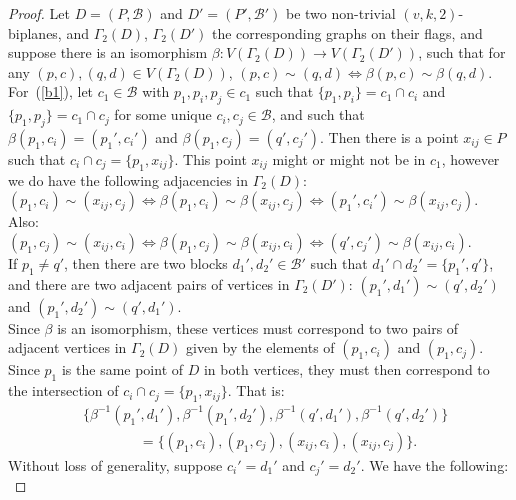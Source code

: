 \documentclass[letterpaper,10pt]{article}
\theoremstyle{plain}
\theoremstyle{definition}
\begin{document}
\begin{proof}
    Let $D=(P,\mathcal{B})$ and $D'=(P',\mathcal{B}')$ be two non-trivial $(v,k,2)$-biplanes, and $\Gamma_2(D)$, $\Gamma_2(D')$ the corresponding graphs on their flags, and suppose there is an isomorphism $\beta:V(\Gamma_2(D))\to V(\Gamma_2(D'))$, such that for any $(p,c),(q,d)\in V(\Gamma_2(D))$, $(p,c)\sim(q,d)\iff\beta(p,c)\sim\beta(q,d)$.\\
    
    For~(\ref{b1}), let $c_1\in\mathcal{B}$ with $p_1,p_i,p_j\in c_1$ such that $\{p_1,p_i\}=c_1\cap c_i$ and $\{p_1,p_j\}=c_1\cap c_j$ for some unique $c_i,c_j\in\mathcal{B}$, and such that $\beta(p_1,c_i)=(p_1',c_i')$ and $\beta(p_1,c_j)=(q',c_j')$. Then there is a point $x_{ij}\in P$ such that $c_i\cap c_j=\{p_1,x_{ij}\}$. This point $x_{ij}$ might or might not be in $c_1$, however we do have the following adjacencies in $\Gamma_2(D)$:\\

$(p_1,c_i)\sim(x_{ij},c_j)\iff\beta(p_1,c_i)\sim\beta(x_{ij},c_j)\iff(p_1',c_i')\sim\beta(x_{ij},c_j).$\\
    
    Also:\\
    
$(p_1,c_j)\sim(x_{ij},c_i)\iff\beta(p_1,c_j)\sim\beta(x_{ij},c_i)\iff(q',c_j')\sim\beta(x_{ij},c_i)$.\\

    If $p_1\neq q'$, then there are two blocks $d_1',d_2'\in\mathcal{B}'$ such that $d_1'\cap d_2'=\{p_1',q'\}$, and there are two adjacent pairs of vertices in $\Gamma_2(D')$: $(p_1',d_1')\sim(q',d_2')$ and $(p_1',d_2')\sim(q',d_1')$.\\

    Since $\beta$ is an isomorphism, these vertices must correspond to two pairs of adjacent vertices in $\Gamma_2(D)$ given by the elements of $(p_1,c_i)$ and $(p_1,c_j)$. Since $p_1$ is the same point of $D$ in both vertices, they must then correspond to the intersection of $c_i\cap c_j=\{p_1,x_{ij}\}$. That is:
    \begin{align*}
    &\{\beta^{-1}(p_1',d_1'),\beta^{-1}(p_1',d_2'),\beta^{-1}(q',d_1'),\beta^{-1}(q',d_2')\}\\
    &\qquad\qquad=\{(p_1,c_i),(p_1,c_j),(x_{ij},c_i),(x_{ij},c_j)\}.
\end{align*}
    Without loss of generality, suppose $c_i'=d_1'$ and $c_j'=d_2'$. We have the following:\\


\end{proof}
\end{document}
